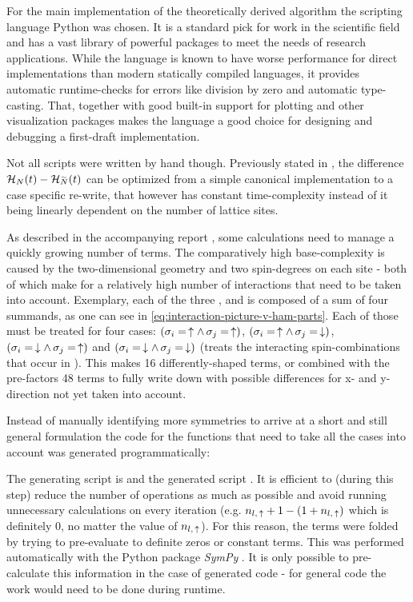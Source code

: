For the main implementation of the theoretically derived algorithm the scripting language Python was chosen.
It is a standard pick for work in the scientific field and has a vast library of powerful packages to meet the needs of research applications.
While the language is known to have worse performance for direct implementations than modern statically compiled languages, it provides automatic runtime-checks for errors like division by zero and automatic type-casting.
That, together with good built-in support for plotting and other visualization packages makes the language a good choice for designing and debugging a first-draft implementation.

Not all scripts were written by hand though.
Previously stated in , the difference $\HNOft - \HNOft[\vphantom{N}\smash{\tilde{N}}]$ can be optimized from a simple canonical implementation to a case specific re-write, that however has constant time-complexity instead of it being linearly dependent on the number of lattice sites.

As described in the accompanying report , some calculations need to manage a quickly growing number of terms.
The comparatively high base-complexity is caused by the two-dimensional geometry and two spin-degrees on each site - both of which make for a relatively high number of interactions that need to be taken into account.
Exemplary, each of the three ,  and  is composed of a sum of four summands, as one can see in \autoref{eq:interaction-picture-v-ham-parts}.
Each of those must be treated for four cases: $(\sigma_i = \,\uparrow \land \,\sigma_j = \,\uparrow)$, $(\sigma_i = \,\uparrow \land \,\sigma_j = \,\downarrow)$, $(\sigma_i = \,\downarrow \land \,\sigma_j = \,\uparrow)$ and $(\sigma_i = \,\downarrow \land \,\sigma_j = \,\downarrow)$ (treats the interacting spin-combinations that occur in ).
This makes 16 differently-shaped terms, or combined with the pre-factors 48 terms to fully write down with possible differences for x- and y-direction not yet taken into account.

Instead of manually identifying more symmetries to arrive at a short and still general formulation the code for the functions that need to take all the cases into account was generated programmatically:

The generating script is  and the generated script .
It is efficient to (during this step) reduce the number of operations as much as possible and avoid running unnecessary calculations on every iteration (e.g. $n_{l,\,\uparrow} + 1 - (1 + n_{l,\,\uparrow})$ which is definitely 0, no matter the value of $n_{l,\,\uparrow}$).
For this reason, the terms were folded by trying to pre-evaluate to definite zeros or constant terms.
This was performed automatically with the Python package \emph{SymPy} \cite{sympyPackage}.
It is only possible to pre-calculate this information in the case of generated code - for general code the work would need to be done during runtime.
